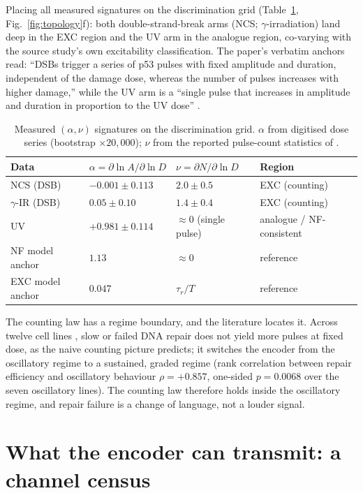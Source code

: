 \documentclass[11pt,a4paper]{article}
\begin{document}
Placing all measured signatures on the discrimination grid (Table~\ref{tab:grid}, Fig.~\ref{fig:topology}f): both double-strand-break arms (NCS; $\gamma$-irradiation) land deep in the EXC region and the UV arm in the analogue region, co-varying with the source study's own excitability classification. The paper's verbatim anchors read: ``DSBs trigger a series of p53 pulses with fixed amplitude and duration, independent of the damage dose, whereas the number of pulses increases with higher damage,'' while the UV arm is a ``single pulse that increases in amplitude and duration in proportion to the UV dose'' \cite{Batchelor2011}.

\begin{table}[!htbp]
\centering
\caption{Measured $(\alpha,\nu)$ signatures on the discrimination grid. $\alpha$ from digitised dose series (bootstrap $\times20{,}000$); $\nu$ from the reported pulse-count statistics of \cite{Monke2017,Lahav2004}.}
\label{tab:grid}
\small
\begin{tabular}{@{}llll@{}}
\toprule
Data & $\alpha=\partial\ln A/\partial\ln D$ & $\nu=\partial N/\partial\ln D$ & Region \\
\midrule
NCS (DSB) & $-0.001\pm0.113$ & $2.0\pm0.5$ & EXC (counting) \\
$\gamma$-IR (DSB) & $0.05\pm0.10$ & $1.4\pm0.4$ & EXC (counting) \\
UV & $+0.981\pm0.114$ & $\approx0$ (single pulse) & analogue / NF-consistent \\
NF model anchor & $1.13$ & $\approx0$ & reference \\
EXC model anchor & $0.047$ & $\tau_r/T$ & reference \\
\bottomrule
\end{tabular}
\end{table}

The counting law has a regime boundary, and the literature locates it. Across twelve cell lines \cite{StewartOrnstein2017}, slow or failed DNA repair does not yield more pulses at fixed dose, as the naive counting picture predicts; it switches the encoder from the oscillatory regime to a sustained, graded regime (rank correlation between repair efficiency and oscillatory behaviour $\rho=+0.857$, one-sided $p=0.0068$ over the seven oscillatory lines). The counting law therefore holds inside the oscillatory regime, and repair failure is a change of language, not a louder signal.

\section{What the encoder can transmit: a channel census}
\label{sec:census}
\end{document}
